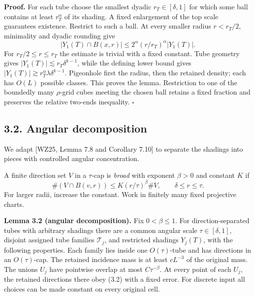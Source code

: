 \documentclass[
  11pt,
  a4paper,
]{article}
\begin{document}
\textbf{Proof.} For each tube choose the smallest dyadic
\(r_T\in[\delta,1]\) for which some ball contains at least
\(r_T^\alpha\) of its shading. A fixed enlargement of the top scale
guarantees existence. Restrict to such a ball. At every smaller radius
\(r<r_T/2\), minimality and dyadic rounding give \[|Y_1(T)\cap B(x,r)|
 \le 2^\alpha(r/r_T)^\alpha |Y_1(T)|.\] For \(r_T/2\le r\le r_T\) the
estimate is trivial with a fixed constant. Tube geometry gives
\(|Y_1(T)|\lesssim r_T\delta^{k-1}\), while the defining lower bound
gives \(|Y_1(T)|\gtrsim r_T^\alpha\lambda\delta^{k-1}\). Pigeonhole
first the radius, then the retained density; each has \(O(L)\) possible
classes. This proves the lemma. Restriction to one of the boundedly many
\(\rho\)-grid cubes meeting the chosen ball retains a fixed fraction and
preserves the relative two-ends inequality. \(\square\)

\hypertarget{angular-decomposition}{%
\subsection{3.2. Angular decomposition}\label{angular-decomposition}}

We adapt {[}WZ25, Lemma 7.8 and Corollary 7.10{]} to separate the
shadings into pieces with controlled angular concentration.

A finite direction set \(V\) in a \(\tau\)-cap is \emph{broad} with
exponent \(\beta>0\) and constant \(K\) if
\[\#(V\cap B(v,r))\le K(r/\tau)^\beta\#V,
 \qquad \delta\le r\le\tau.
 \tag{3.2}\label{eq:3.2}\] For larger radii, increase the constant. Work in finitely
many fixed projective charts.

\textbf{Lemma 3.2 (angular decomposition).} Fix \(0<\beta\le1\). For
direction-separated tubes with arbitrary shadings there are a common
angular scale \(\tau\in[\delta,1]\), disjoint assigned tube families
\(\mathcal T_j\), and restricted shadings \(Y_j(T)\), with the following
properties. Each family lies inside one \(O(\tau)\)-tube and has
directions in an \(O(\tau)\)-cap. The retained incidence mass is at
least \(cL^{-3}\) of the original mass. The unions \(U_j\) have
pointwise overlap at most \(C\tau^{-\beta}\). At every point of each
\(U_j\), the retained directions there obey (3.2) with a fixed error.
For discrete input all choices can be made constant on every original
cell.
\end{document}
